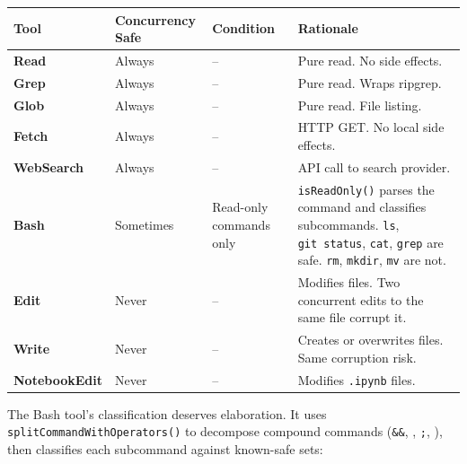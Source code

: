 \documentclass[
  english,
  11pt,
  letterpaper,
]{book}
\begin{document}
\begin{longtable}[]{@{}
  >{\raggedright\arraybackslash}p{}
  >{\raggedright\arraybackslash}p{}
  >{\raggedright\arraybackslash}p{}
  >{\raggedright\arraybackslash}p{}@{}}
\toprule\noalign{}
\begin{minipage}[b]{\linewidth}\raggedright
Tool
\end{minipage} & \begin{minipage}[b]{\linewidth}\raggedright
Concurrency Safe
\end{minipage} & \begin{minipage}[b]{\linewidth}\raggedright
Condition
\end{minipage} & \begin{minipage}[b]{\linewidth}\raggedright
Rationale
\end{minipage} \\
\midrule\noalign{}
\endhead
\bottomrule\noalign{}
\endlastfoot
\textbf{Read} & Always & -- & Pure read. No side effects. \\
\textbf{Grep} & Always & -- & Pure read. Wraps ripgrep. \\
\textbf{Glob} & Always & -- & Pure read. File listing. \\
\textbf{Fetch} & Always & -- & HTTP GET. No local side effects. \\
\textbf{WebSearch} & Always & -- & API call to search provider. \\
\textbf{Bash} & Sometimes & Read-only commands only &
\texttt{isReadOnly()} parses the command and classifies subcommands.
\texttt{ls}, \texttt{git\ status}, \texttt{cat}, \texttt{grep} are safe.
\texttt{rm}, \texttt{mkdir}, \texttt{mv} are not. \\
\textbf{Edit} & Never & -- & Modifies files. Two concurrent edits to the
same file corrupt it. \\
\textbf{Write} & Never & -- & Creates or overwrites files. Same
corruption risk. \\
\textbf{NotebookEdit} & Never & -- & Modifies \texttt{.ipynb} files. \\
\end{longtable}

The Bash tool's classification deserves elaboration. It uses
\texttt{splitCommandWithOperators()} to decompose compound commands
(\texttt{\&\&}, \texttt{\textbar{}\textbar{}}, \texttt{;},
\texttt{\textbar{}}), then classifies each subcommand against known-safe
sets:
\end{document}
